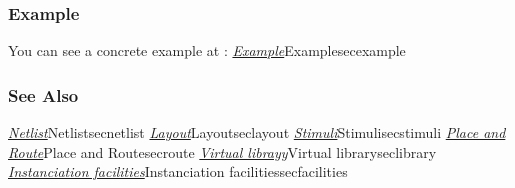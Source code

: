 %

\begin{htmlonly}

\subsubsection{Example}

You can see a concrete example at : \hyperref[ref]{\emph{Example}}{}{Example}{secexample}

\subsubsection{See Also}

\hyperref[ref]{\emph{Netlist}}{}{Netlist}{secnetlist}
\hyperref[ref]{\emph{Layout}}{}{Layout}{seclayout}
\hyperref[ref]{\emph{Stimuli}}{}{Stimuli}{secstimuli}
\hyperref[ref]{\emph{Place and Route}}{}{Place and Route}{secroute}
\hyperref[ref]{\emph{Virtual librayy}}{}{Virtual library}{seclibrary}
\hyperref[ref]{\emph{Instanciation facilities}}{}{Instanciation facilities}{secfacilities}

\end{htmlonly}

